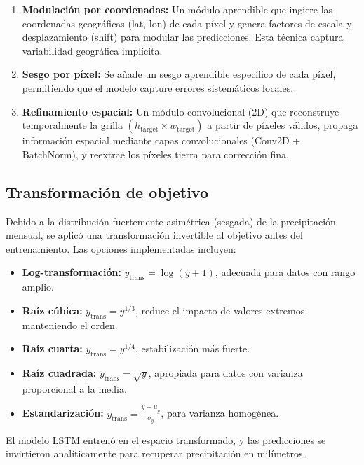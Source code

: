 \begin{enumerate}
    \item \textbf{Modulación por coordenadas:} Un módulo aprendible que ingiere las coordenadas geográficas (lat, lon) de cada píxel y genera factores de escala y desplazamiento (shift) para modular las predicciones. Esta técnica captura variabilidad geográfica implícita.
    
    \item \textbf{Sesgo por píxel:} Se añade un sesgo aprendible específico de cada píxel, permitiendo que el modelo capture errores sistemáticos locales.
    
    \item \textbf{Refinamiento espacial:} Un módulo convolucional (2D) que reconstruye temporalmente la grilla $(h_{\text{target}} \times w_{\text{target}})$ a partir de píxeles válidos, propaga información espacial mediante capas convolucionales (Conv2D + BatchNorm), y reextrae los píxeles tierra para corrección fina.
\end{enumerate}

\subsection{Transformación de objetivo}
Debido a la distribución fuertemente asimétrica (sesgada) de la precipitación mensual, se aplicó una transformación invertible al objetivo antes del entrenamiento. Las opciones implementadas incluyen:

\begin{itemize}
    \item \textbf{Log-transformación:} $y_{\text{trans}} = \log(y + 1)$, adecuada para datos con rango amplio.
    \item \textbf{Raíz cúbica:} $y_{\text{trans}} = y^{1/3}$, reduce el impacto de valores extremos manteniendo el orden.
    \item \textbf{Raíz cuarta:} $y_{\text{trans}} = y^{1/4}$, estabilización más fuerte.
    \item \textbf{Raíz cuadrada:} $y_{\text{trans}} = \sqrt{y}$, apropiada para datos con varianza proporcional a la media.
    \item \textbf{Estandarización:} $y_{\text{trans}} = \frac{y - \mu_y}{\sigma_y}$, para varianza homogénea.
\end{itemize}

El modelo LSTM entrenó en el espacio transformado, y las predicciones se invirtieron analíticamente para recuperar precipitación en milímetros.

